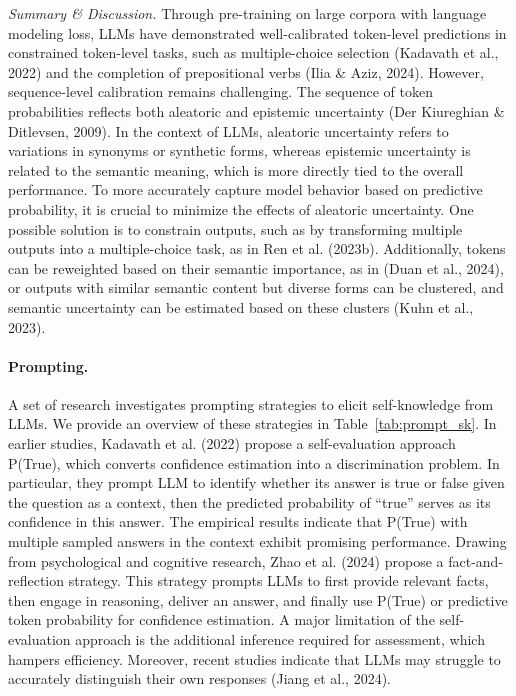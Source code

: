 \emph{Summary \& Discussion.} Through pre-training on large corpora with language modeling loss, LLMs have demonstrated well-calibrated token-level predictions in constrained token-level tasks, such as multiple-choice selection (Kadavath et al., 2022) and the completion of prepositional verbs (Ilia \& Aziz, 2024). However, sequence-level calibration remains challenging. The sequence of token probabilities reflects both aleatoric and epistemic uncertainty (Der Kiureghian \& Ditlevsen, 2009). In the context of LLMs, aleatoric uncertainty refers to variations in synonyms or synthetic forms, whereas epistemic uncertainty is related to the semantic meaning, which is more directly tied to the overall performance. To more accurately capture model behavior based on predictive probability, it is crucial to minimize the effects of aleatoric uncertainty. One possible solution is to constrain outputs, such as by transforming multiple outputs into a multiple-choice task, as in Ren et al. (2023b). Additionally, tokens can be reweighted based on their semantic importance, as in (Duan et al., 2024), or outputs with similar semantic content but diverse forms can be clustered, and semantic uncertainty can be estimated based on these clusters (Kuhn et al., 2023).

\paragraph{Prompting.} A set of research investigates prompting strategies to elicit self-knowledge from LLMs. We provide an overview of these strategies in Table~\ref{tab:prompt_sk}. In earlier studies, Kadavath et al. (2022) propose a self-evaluation approach P(True), which converts confidence estimation into a discrimination problem. In particular, they prompt LLM to identify whether its answer is true or false given the question as a context, then the predicted probability of ``true'' serves as its confidence in this answer. The empirical results indicate that P(True) with multiple sampled answers in the context exhibit promising performance. Drawing from psychological and cognitive research, Zhao et al. (2024) propose a fact-and-reflection strategy. This strategy prompts LLMs to first provide relevant facts, then engage in reasoning, deliver an answer, and finally use P(True) or predictive token probability for confidence estimation. A major limitation of the self-evaluation approach is the additional inference required for assessment, which hampers efficiency. Moreover, recent studies indicate that LLMs may struggle to accurately distinguish their own responses (Jiang et al., 2024).

